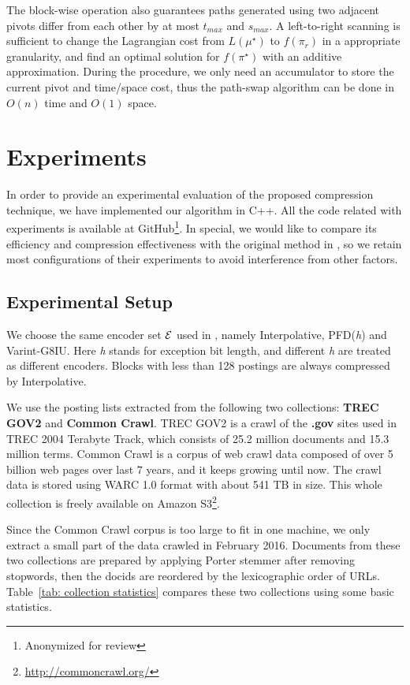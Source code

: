 \documentclass{sig-alternate-05-2015}
\begin{document}
The block-wise operation also guarantees paths generated using two adjacent pivots differ from each other by at most $ t_{max} $ and $ s_{max} $.
A left-to-right scanning is sufficient to change the Lagrangian cost from $ L(\mu^\star) $ to $ f(\pi_r) $ in a appropriate granularity, and find an optimal solution for $ f(\pi^\star) $ with an additive approximation.
During the procedure, we only need an accumulator to store the current pivot and time/space cost, thus the path-swap algorithm can be done in $ O(n) $ time and $ O(1) $ space.

\section{Experiments}\label{sec: experiments}
In order to provide an experimental evaluation of the proposed compression technique, we have implemented our algorithm in C++.
All the code related with experiments is available at GitHub\footnote{Anonymized for review}.
In special, we would like to compare its efficiency and compression effectiveness with the original method in \cite{ottaviano2015optimal}, so we retain most configurations of their experiments to avoid interference from other factors.

\subsection{Experimental Setup}
We choose the same encoder set $ \cal E $ used in \cite{ottaviano2015optimal}, namely Interpolative, PFD(\textit{h}) and Varint-G8IU.
Here \textit{h} stands for exception bit length, and different \textit{h} are treated as different encoders.
Blocks with less than 128 postings are always compressed by Interpolative.

We use the posting lists extracted from the following two collections: \textbf{TREC GOV2} and \textbf{Common Crawl}.
TREC GOV2 is a crawl of the \textbf{.gov} sites used in TREC 2004 Terabyte Track, which consists of 25.2 million documents and 15.3 million terms.
Common Crawl is a corpus of web crawl data composed of over 5 billion web pages over last 7 years, and it keeps growing until now.
The crawl data is stored using WARC 1.0 format with about 541 TB in size.
This whole collection is freely available on Amazon S3\footnote{\url{http://commoncrawl.org/}}. 


Since the Common Crawl corpus is too large to fit in one machine, we only extract a small part of the data crawled in February 2016.
Documents from these two collections are prepared by applying Porter stemmer after removing stopwords, then the docids are reordered by the lexicographic order of URLs.
Table~\ref{tab: collection statistics} compares these two collections using some basic statistics.
\end{document}
